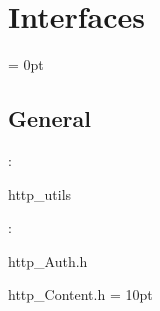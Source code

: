 
\section{Interfaces} 


\parskip = 0pt

\vspace{3mm} \subsection*{General}

: 

http\_utils
\vspace{2mm}

\vspace{5mm}

: 

http\_Auth.h

http\_Content.h
\vspace{2mm}\parskip = 10pt 
